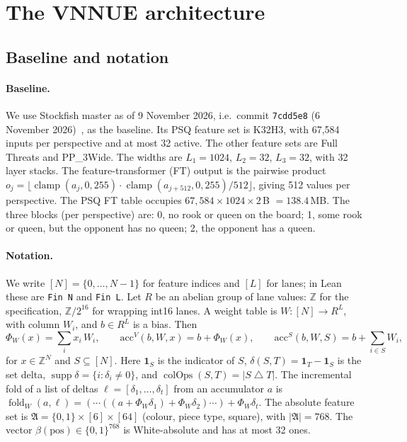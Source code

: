 \documentclass[10pt]{article}
\newcommand{\Z}{\mathbb{Z}}
\newcommand{\Zm}[1]{\Z/2^{#1}}
\newcommand{\one}{\mathbf{1}}
\DeclareMathOperator{\supp}{supp}
\DeclareMathOperator{\colops}{colOps}
\DeclareMathOperator{\fold}{fold}
\DeclareMathOperator{\clamp}{clamp}
\newcommand{\accV}{\mathrm{acc}^{V}}
\newcommand{\accS}{\mathrm{acc}^{S}}
\newcommand{\symd}{\mathbin{\triangle}}
\theoremstyle{plain}
\theoremstyle{definition}
\begin{document}
\section{The VNNUE architecture}\label{sec:arch}

\subsection{Baseline and notation}

\paragraph{Baseline.}
We use Stockfish master as of 9 November 2026, i.e.\ commit \texttt{7cdd5e8} (6 November 2026)~\cite{sfsource}, as the baseline.
Its PSQ feature set is K32H3, with 67,584 inputs per perspective and at most 32 active.
The other feature sets are Full Threats and PP\_3Wide.
The widths are $L_1=1024$, $L_2=32$, $L_3=32$, with 32 layer stacks.
The feature-transformer (FT) output is the pairwise product $o_j=\lfloor\clamp(a_j,0,255)\cdot\clamp(a_{j+512},0,255)/512\rfloor$, giving 512 values per perspective.
The PSQ FT table occupies $67{,}584\times1024\times2$\,B $=138.4$\,MB.
The three blocks (per perspective) are: 0, no rook or queen on the board; 1, some rook or queen, but the opponent has no queen; 2, the opponent has a queen.

\paragraph{Notation.}
We write $[N]=\{0,\dots,N-1\}$ for feature indices and $[L]$ for lanes; in Lean these are \texttt{Fin N} and \texttt{Fin L}.
Let $R$ be an abelian group of lane values: $\Z$ for the specification, $\Zm{16}$ for wrapping int16 lanes.
A weight table is $W:[N]\to R^{L}$, with column $W_i$, and $b\in R^L$ is a bias.
Then
\[
\Phi_W(x)=\sum_{i}x_i\,W_i,\qquad
\accV(b,W,x)=b+\Phi_W(x),\qquad
\accS(b,W,S)=b+\sum_{i\in S}W_i,
\]
for $x\in\Z^N$ and $S\subseteq[N]$.
Here $\one_S$ is the indicator of $S$, $\delta(S,T)=\one_T-\one_S$ is the set delta, $\supp\delta=\{i:\delta_i\neq0\}$, and $\colops(S,T)=|S\symd T|$.
The incremental fold of a list of deltas $\ell=[\delta_1,\dots,\delta_t]$ from an accumulator $a$ is $\fold_W(a,\ell)=(\cdots((a+\Phi_W\delta_1)+\Phi_W\delta_2)\cdots)+\Phi_W\delta_t$.
The absolute feature set is $\mathfrak A=\{0,1\}\times[6]\times[64]$ (colour, piece type, square), with $|\mathfrak A|=768$.
The vector $\beta(\text{pos})\in\{0,1\}^{768}$ is White-absolute and has at most 32 ones.
\end{document}
